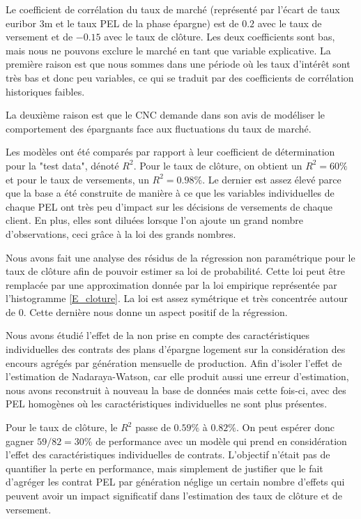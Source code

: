 \documentclass[12pt, a4paper]{book}
\begin{document}
Le coefficient de corrélation du taux de marché (représenté par l'écart de taux euribor 3m et le taux PEL de la phase épargne) est de $0.2$ avec le taux de versement et de $-0.15$ avec le taux de clôture. Les deux coefficients sont bas, mais nous ne pouvons exclure le marché en tant que variable explicative. La première raison est que nous sommes dans une période où les taux d'intérêt sont très bas et donc peu variables, ce qui se traduit par des coefficients de corrélation historiques faibles.

La deuxième raison est que le CNC demande dans son avis \cite{CNC1} de modéliser le comportement des épargnants face aux fluctuations du taux de marché.

Les modèles ont été comparés par rapport à leur coefficient de détermination pour la "test data", dénoté $R^2$. Pour le taux de clôture, on obtient un $R^2 = 60\%$ et pour le taux de versements, un $R^2 = 0.98\%$. Le dernier est assez élevé parce que la base a été construite de manière à ce que les variables individuelles de chaque PEL ont très peu d'impact sur les décisions de versements de chaque client. En plus, elles sont diluées lorsque l'on ajoute un grand nombre d'observations, ceci grâce à la loi des grands nombres.

Nous avons fait une analyse des résidus de la régression non paramétrique pour le taux de clôture afin de pouvoir estimer sa loi de probabilité. Cette loi peut être remplacée par une approximation donnée par la loi empirique représentée par l'histogramme \ref{E_cloture}. La loi est assez symétrique et très concentrée autour de $0$. Cette dernière nous donne un aspect positif de la régression.

Nous avons étudié l'effet de la non prise en compte des caractéristiques individuelles des contrats des plans d'épargne logement sur la considération des encours agrégés par génération mensuelle de production.  Afin d'isoler l'effet de l'estimation de Nadaraya-Watson, car elle produit aussi une erreur d'estimation, nous avons reconstruit à nouveau la base de données  mais cette fois-ci, avec des PEL homogènes où les caractéristiques individuelles ne sont plus présentes. 

Pour le taux de clôture, le $R^2$ passe de $0.59\%$ à $0.82\%$. On peut espérer donc gagner $59/82 = 30\%$ de performance avec un modèle qui prend en considération l'effet des caractéristiques individuelles de contrats. L'objectif n'était pas de quantifier la perte en performance, mais simplement de justifier que le fait d'agréger les contrat PEL par génération néglige un certain nombre d'effets qui peuvent avoir un impact significatif dans l'estimation des taux de clôture et de versement.  
 
\end{document}
